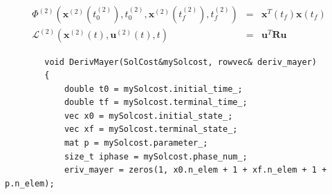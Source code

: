 \documentclass[10pt]{article}
\begin{document}
\begin{itemize}
\begin{frame}
\begin{displaymath}
		\begin{array}{lcl}
		\Phi^{(2)}(\mathbf x^{(2)}(t_0^{(2)}),t_0^{(2)},\mathbf x^{(2)}(t_f^{(2)}),t_f^{(2)}) & = & \mathbf x^T(t_f)\mathbf x(t_f) \\
		\mathcal L^{(2)}(\mathbf x^{(2)}(t),\mathbf u^{(2)}(t),t) & = & \mathbf u^T\mathbf R\mathbf u
		\end{array}
		\end{displaymath}
		\begin{lstlisting}
		void DerivMayer(SolCost&mySolcost, rowvec& deriv_mayer)
		{
			double t0 = mySolcost.initial_time_;
			double tf = mySolcost.terminal_time_;
			vec x0 = mySolcost.initial_state_;
			vec xf = mySolcost.terminal_state_;
			mat p = mySolcost.parameter_;
			size_t iphase = mySolcost.phase_num_;
			eriv_mayer = zeros(1, x0.n_elem + 1 + xf.n_elem + 1 + p.n_elem);
			

\end{lstlisting}
\end{frame}
\end{itemize}
\end{document}
